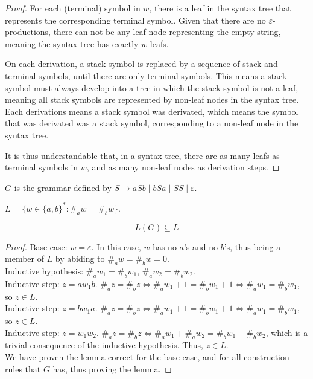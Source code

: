 \documentclass[docid=TP08]{tcom_TP}
\begin{document}
{\begin{proof}
For each (terminal) symbol in $w$, there is a leaf in the syntax tree that represents the corresponding terminal symbol. Given that there are no $\varepsilon$-productions, there can not be any leaf node representing the empty string, meaning the syntax tree has exactly $w$ leafs.\par
On each derivation, a stack symbol is replaced by a sequence of stack and terminal symbols, until there are only terminal symbols. This means a stack symbol must always develop into a tree in which the stack symbol is not a leaf, meaning all stack symbols are represented by non-leaf nodes in the syntax tree. Each derivations means a stack symbol was derivated, which means the symbol that was derivated was a stack symbol, corresponding to a non-leaf node in the syntax tree.\par
It is thus understandable that, in a syntax tree, there are as many leafs as terminal symbols in $w$, and as many non-leaf nodes as derivation steps.
\end{proof}
\pagebreak
{}
\begin{definition}
$G$ is the grammar defined by $S \rightarrow aSb\mid bSa\mid SS\mid \varepsilon$.
\end{definition}
\begin{definition}
$L=\{w \in \{a,b\}^*\colon \#_aw=\#_bw\}$.
\end{definition}
\begin{lemma} \label{lem:AimpB}
\begin{equation*}
	L(G) \subseteq L
\end{equation*}
\end{lemma}
\begin{proof}
Base case: $w=\varepsilon$. In this case, $w$ has no $a$'s and no $b$'s, thus being a member of $L$ by abiding to $\#_aw=\#_bw=0$.\\
Inductive hypothesis: $\#_aw_1=\#_bw_1$, $\#_aw_2=\#_bw_2$.\\
Inductive step: $z=aw_1b$. $\#_az=\#_bz \iff \#_aw_1+1=\#_bw_1+1 \iff \#_aw_1=\#_bw_1$, so $z \in L$.\\
Inductive step: $z=bw_1a$. $\#_az=\#_bz \iff \#_aw_1+1=\#_bw_1+1 \iff \#_aw_1=\#_bw_1$, so $z \in L$.\\
Inductive step: $z=w_1w_2$. $\#_az=\#_bz \iff \#_aw_1+\#_aw_2=\#_bw_1+\#_bw_2$, which is a trivial consequence of the inductive hypothesis. Thus, $z \in L$.\\
We have proven the lemma correct for the base case, and for all construction rules that $G$ has, thus proving the lemma.

\end{proof}}
\end{document}
